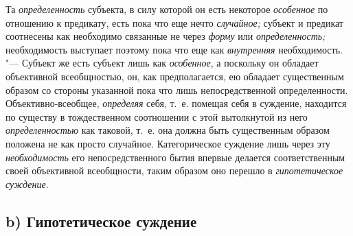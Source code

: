 Та {\em определенность} субъекта, в силу которой он есть некоторое
{\em особенное} по отношению к предикату, есть пока что еще нечто
{\em случайное;} субъект и предикат соотнесены как необходимо связанные
не через {\em форму} или {\em определенность;}
необходимость выступает поэтому пока что еще как
{\em внутренняя} необходимость. "--- Субъект же есть субъект лишь
как {\em особенное}, а поскольку он обладает объективной всеобщностью,
он, как предполагается, ею
обладает существенным образом со стороны указанной пока что лишь
непосредственной определенности. Объективно-всеобщее, {\em определяя} себя,
т.~е. помещая себя в суждение, находится по существу в тождественном
соотношении с этой вытолкнутой из него {\em определенностью} как
таковой, т.~е. она должна быть существенным образом положена не как просто
случайное. Категорическое суждение лишь через эту {\em необходимость} его
непосредственного бытия впервые делается соответственным своей объективной
всеобщности, таким образом оно перешло в {\em гипотетическое суждение}.

\subsection[b) Гипотетическое суждение]{b) Гипотетическое суждение}

